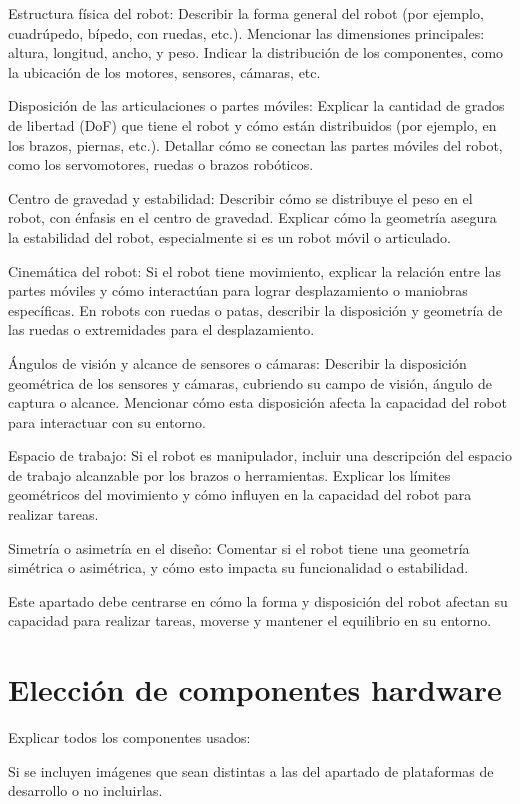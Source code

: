 Estructura física del robot:
Describir la forma general del robot (por ejemplo, cuadrúpedo, bípedo, con ruedas, etc.).
Mencionar las dimensiones principales: altura, longitud, ancho, y peso.
Indicar la distribución de los componentes, como la ubicación de los motores, sensores, cámaras, etc.

Disposición de las articulaciones o partes móviles:
Explicar la cantidad de grados de libertad (DoF) que tiene el robot y cómo están distribuidos (por ejemplo, en los brazos, piernas, etc.).
Detallar cómo se conectan las partes móviles del robot, como los servomotores, ruedas o brazos robóticos.

Centro de gravedad y estabilidad:
Describir cómo se distribuye el peso en el robot, con énfasis en el centro de gravedad.
Explicar cómo la geometría asegura la estabilidad del robot, especialmente si es un robot móvil o articulado.

Cinemática del robot:
Si el robot tiene movimiento, explicar la relación entre las partes móviles y cómo interactúan para lograr desplazamiento o maniobras específicas.
En robots con ruedas o patas, describir la disposición y geometría de las ruedas o extremidades para el desplazamiento.

Ángulos de visión y alcance de sensores o cámaras:
Describir la disposición geométrica de los sensores y cámaras, cubriendo su campo de visión, ángulo de captura o alcance.
Mencionar cómo esta disposición afecta la capacidad del robot para interactuar con su entorno.

Espacio de trabajo:
Si el robot es manipulador, incluir una descripción del espacio de trabajo alcanzable por los brazos o herramientas.
Explicar los límites geométricos del movimiento y cómo influyen en la capacidad del robot para realizar tareas.

Simetría o asimetría en el diseño:
Comentar si el robot tiene una geometría simétrica o asimétrica, y cómo esto impacta su funcionalidad o estabilidad.

Este apartado debe centrarse en cómo la forma y disposición del robot afectan su capacidad para realizar tareas, moverse y mantener el equilibrio en su entorno.


\section{Elección de componentes hardware}

Explicar todos los componentes usados: 

Si se incluyen imágenes que sean distintas a las del apartado de plataformas de desarrollo o no incluirlas.

